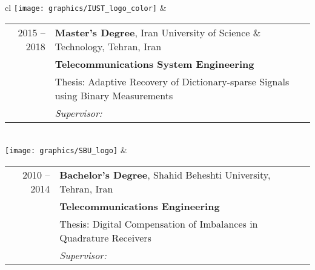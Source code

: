 
\begin{tabular}{cl}
	\texttt{[image: graphics/IUST\_logo\_color]} & 
	\begin{tabular}{rl}
		\textsc{2015 --2018} & \textbf{Master’s Degree},  Iran University of Science \& Technology,  Tehran, Iran                            \\
		                     & \textbf{Telecommunications System Engineering}                                                                \\
		                     & Thesis: Adaptive Recovery of Dictionary-sparse Signals using Binary Measurements                              \\
		                     & \emph{Supervisor: \link{http://www.iust.ac.ir/content/45110/Dr.-Haddadi}{Assistant Professor Farzan Haddadi}} \\
	\end{tabular}
	\\
	\texttt{[image: graphics/SBU\_logo]}        & 
	\begin{tabular}{rl}
		\textsc{2010 --2014} & \textbf{Bachelor's Degree},  Shahid Beheshti University, Tehran, Iran                                  \\
		                     & \textbf{Telecommunications Engineering}                                                                \\
		                     & Thesis: Digital Compensation of Imbalances in Quadrature Receivers                                     \\
		                     & \emph{Supervisor: \link{https://ece.sbu.ac.ir/~f-torkamani}{Associate Professor Farah Torkamani Azar}} \\
	\end{tabular}
	\\
\end{tabular}
\\

